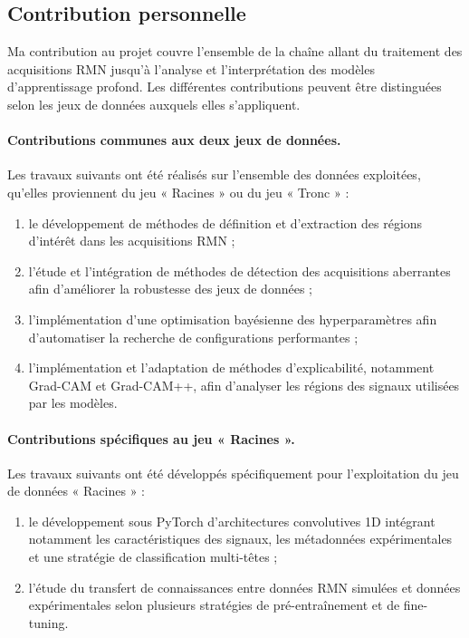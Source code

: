 \documentclass[12pt,a4paper,twoside]{article}
\begin{document}
\subsection{Contribution personnelle}
\label{subsec:contribution_perso}

Ma contribution au projet couvre l'ensemble de la chaîne allant du traitement des
acquisitions RMN jusqu'à l'analyse et l'interprétation des modèles
d'apprentissage profond. Les différentes contributions peuvent être distinguées
selon les jeux de données auxquels elles s'appliquent.

\paragraph{Contributions communes aux deux jeux de données.}
Les travaux suivants ont été réalisés sur l'ensemble des données exploitées,
qu'elles proviennent du jeu « Racines » ou du jeu « Tronc » :

\begin{enumerate}
\item le développement de méthodes de définition et d'extraction des régions
d'intérêt dans les acquisitions RMN ;

\item l'étude et l'intégration de méthodes de détection des acquisitions
aberrantes afin d'améliorer la robustesse des jeux de données ;

\item l'implémentation d'une optimisation bayésienne des hyperparamètres
afin d'automatiser la recherche de configurations performantes ;

\item l'implémentation et l'adaptation de méthodes d'explicabilité, notamment
Grad-CAM et Grad-CAM++, afin d'analyser les régions des signaux utilisées
par les modèles.

\end{enumerate}

\paragraph{Contributions spécifiques au jeu « Racines ».}
Les travaux suivants ont été développés spécifiquement pour l'exploitation du
jeu de données « Racines » :

\begin{enumerate}
\item le développement sous PyTorch d'architectures convolutives 1D intégrant
notamment les caractéristiques des signaux, les métadonnées expérimentales
et une stratégie de classification multi-têtes ;

\item l'étude du transfert de connaissances entre données RMN simulées et
données expérimentales selon plusieurs stratégies de pré-entraînement et
de fine-tuning.

\end{enumerate}
\end{document}
